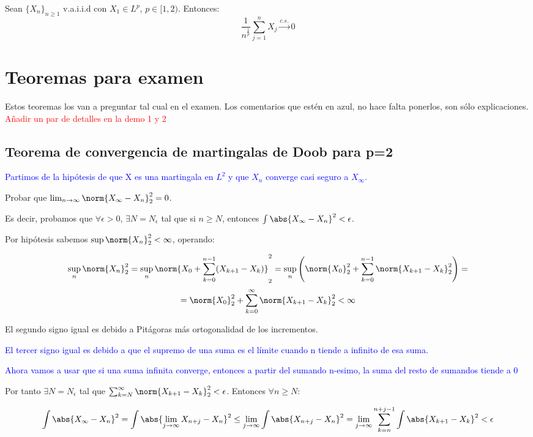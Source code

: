 \documentclass{apuntes}
\begin{document}
\begin{theorem}
Sean $\{X_n\}_{n\geq 1}$ v.a.i.i.d con $X_1 \in L^p$, $p\in [1,2)$. Entonces:
\[
\frac{1}{n^{\frac{1}{p}}} \sum_{j=1}^{n}X_j \stackrel{c.s.}{\rightarrow} 0
\]
\end{theorem}

\chapter{Teoremas para examen}
Estos teoremas los van a preguntar tal cual en el examen. Los comentarios que estén en azul, no hace falta ponerlos, son sólo explicaciones. \textcolor{red}{Añadir un par de detalles en la demo 1 y 2}

\section{Teorema de convergencia de martingalas de Doob para p=2}
\textcolor{blue}{Partimos de la hipótesis de que X es una martingala en $L^2$ y que $X_n$ converge casi seguro a $X_{\infty}$.}

Probar que $\lim_{n \rightarrow \infty}\norm{X_{\infty}-X_n}_2^2=0$.


Es decir, probamos que $\forall \epsilon > 0$, $\exists N = N_{\epsilon}$ tal que si $n\geq N$, entonces $\int \abs{X_{\infty}-X_n}^2 < \epsilon$.

Por hipótesis sabemos $\sup \norm{X_n}_2^2 < \infty$, operando:

\[
\sup_n \norm{X_n}_2^2 = \sup_n \norm{X_0 +\sum_{k=0}^{n-1}(X_{k+1}-X_k)}_2^2 = \sup_n \left( \norm{X_0}_2^2 +\sum_{k=0}^{n-1}\norm{X_{k+1}-X_k}_2^2 \right) =
\]
\[
= \norm{X_0}_2^2 +\sum_{k=0}^{\infty}\norm{X_{k+1}-X_k}_2^2 < \infty
\]

El segundo signo igual es debido a Pitágoras más ortogonalidad de los incrementos.

\textcolor{blue}{El tercer signo igual es debido a que el supremo de una suma es el límite cuando n tiende a infinito de esa suma.}

\textcolor{blue}{Ahora vamos a usar que si una suma infinita converge, entonces a partir del sumando n-esimo, la suma del resto de sumandos tiende a 0}

Por tanto $\exists N = N_{\epsilon}$ tal que $\sum_{k=N}^{\infty} \norm{X_{k+1}-X_k}_2^2 < \epsilon$. Entonces $\forall n \geq N$:

\[
\int \abs{X_{\infty}-X_n}^2 = \int \abs{\lim_{j \rightarrow \infty} X_{n+j}-X_n}^2 \leq \lim_{j \rightarrow \infty} \int \abs{ X_{n+j}-X_n}^2 = \lim_{j \rightarrow \infty} \sum_{k=n}^{n+j-1}\int \abs{X_{k+1}-X_k}^2 < \epsilon
\]
\end{document}

